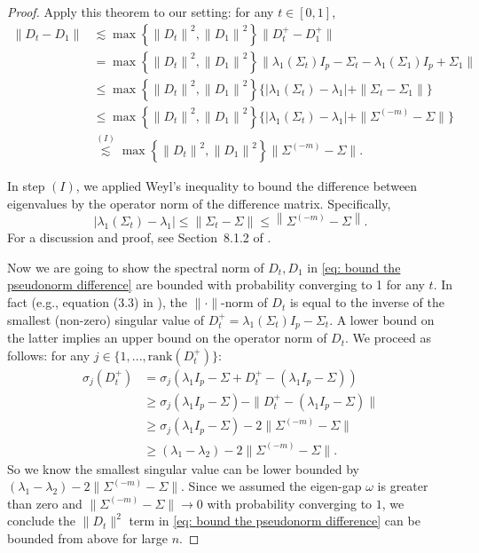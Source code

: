 \documentclass[11pt]{article}
\begin{document}
\begin{proof}
Apply this theorem to our setting: for any $t\in[0,1]$,
\begin{equation}\label{eq: bound the pseudonorm difference}
    \begin{aligned}
            \left\|D_t-D_1\right\| & \lesssim 
\max \left\{\left\|D_t\right\|^2,\left\|D_1\right\|^2\right\}\|D_t^+ - D_1^+\|\\
& = \max \left\{\left\|D_t\right\|^2,\left\|D_1\right\|^2\right\}\|\lambda_1(\Sigma_t)I_p - \Sigma_t - \lambda_1(\Sigma_1)I_p + \Sigma_1\|\\
& \leq \max \left\{\left\|D_t\right\|^2,\left\|D_1\right\|^2\right\}\{|\lambda_1(\Sigma_t) - \lambda_1| + \|\Sigma_t - \Sigma_1\|\}\\
& \leq \max \left\{\left\|D_t\right\|^2,\left\|D_1\right\|^2\right\}\{|\lambda_1(\Sigma_t) - \lambda_1| + \|\Sigma^{(-m)} - \Sigma\|\}\\
& \stackrel{(I)}{\lesssim} \max \left\{\left\|D_t\right\|^2,\left\|D_1\right\|^2\right\}\|\Sigma^{(-m)} - \Sigma\|.
    \end{aligned}
\end{equation}

In step $(I)$, we applied Weyl's inequality to bound the difference between eigenvalues by the operator norm of the difference matrix. Specifically,
\begin{equation*}
\left|\lambda_1\left(\Sigma_t\right)-\lambda_1\right| \leq\left\|\Sigma_t-\Sigma\right\| \leq\left\|\Sigma^{(-m)}-\Sigma\right\| .
\end{equation*}
For a discussion and proof, see Section~8.1.2 of \cite{wainwright2019high}.

Now we are going to show the spectral norm of $D_t, D_1$ in \eqref{eq: bound the pseudonorm difference} are bounded with probability converging to 1 for any $t$. In fact (e.g., equation (3.3) in \cite{wedin1973perturbation}), the $\|\cdot\|$-norm of $D_t$ is equal to the inverse of the smallest (non-zero) singular value of $D_t^+ = \lambda_1(\Sigma_t)I_p - \Sigma_t$. A lower bound on the latter implies an upper bound on the operator norm of $D_t$. We proceed as follows: for any $j\in\{1,...,\text{rank}(D_t^+)\}$:
\begin{equation*}
    \begin{aligned}
      \sigma_{j}(D_t^+) 
      & = \sigma_{j}(\lambda_1I_p - \Sigma + D_t^+ - (\lambda_1I_p - \Sigma))\\
      & \geq \sigma_j(\lambda_1I_p - \Sigma) - \|D_t^+ - (\lambda_1I_p - \Sigma)\|\\
      & \geq \sigma_j(\lambda_1I_p - \Sigma) - 2\|\Sigma^{(-m)} - \Sigma\|\\
      & \geq (\lambda_1 - \lambda_2)- 2\|\Sigma^{(-m)} - \Sigma\|.
    \end{aligned}
\end{equation*}
So we know the smallest singular value can be lower bounded by $(\lambda_1 - \lambda_2)- 2\|\Sigma^{(-m)} - \Sigma\|$. Since we assumed the eigen-gap $\omega$ is greater than zero and $\|\Sigma^{(-m)} - \Sigma\|\rightarrow 0$ with probability converging to $1$, we conclude the $\|D_t\|^2$ term in \eqref{eq: bound the pseudonorm difference} can be bounded from above for large $n$. 


\end{proof}
\end{document}

